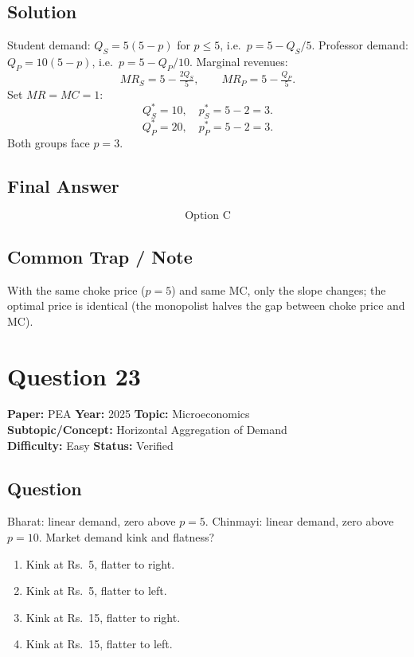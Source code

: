 \documentclass[11pt]{article}
\begin{document}
\subsection*{Solution}
Student demand: $Q_S = 5(5-p)$ for $p\le 5$, i.e.\ $p = 5 - Q_S/5$.
Professor demand: $Q_P = 10(5-p)$, i.e.\ $p = 5 - Q_P/10$.
Marginal revenues:
\[
MR_S = 5 - \tfrac{2Q_S}{5},\qquad MR_P = 5 - \tfrac{Q_P}{5}.
\]
Set $MR = MC = 1$:
\[
Q_S^* = 10,\quad p_S^* = 5 - 2 = 3.
\]
\[
Q_P^* = 20,\quad p_P^* = 5 - 2 = 3.
\]
Both groups face $p = 3$.

\subsection*{Final Answer}
\[
\boxed{\text{Option C}}
\]

\subsection*{Common Trap / Note}
With the same choke price ($p=5$) and same MC, only the slope changes; the optimal price is identical (the monopolist halves the gap between choke price and MC).

\section*{Question 23}
\textbf{Paper:} PEA \quad \textbf{Year:} 2025 \quad \textbf{Topic:} Microeconomics \\
\textbf{Subtopic/Concept:} Horizontal Aggregation of Demand \\
\textbf{Difficulty:} Easy \quad \textbf{Status:} Verified

\subsection*{Question}
Bharat: linear demand, zero above $p=5$. Chinmayi: linear demand, zero above $p=10$. Market demand kink and flatness?

\begin{enumerate}[label=(\Alph*)]
\item Kink at Rs.~5, flatter to right.
\item Kink at Rs.~5, flatter to left.
\item Kink at Rs.~15, flatter to right.
\item Kink at Rs.~15, flatter to left.
\end{enumerate}
\end{document}
